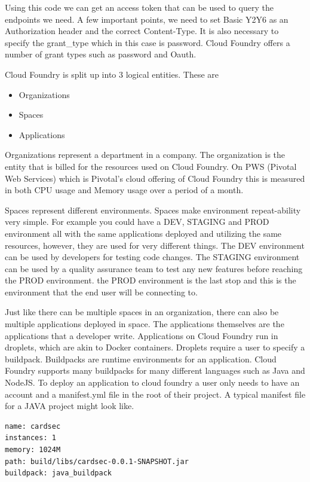 Using this code we can get an access token that can be used to query the endpoints we need. A few important points, we need to set Basic Y2Y6 as an Authorization header and the correct Content-Type. It is also necessary to specify the grant\_type which in this case is password. Cloud Foundry offers a number of grant types such as password and Oauth. 

Cloud Foundry is split up into 3 logical entities. These are

\begin{itemize}
  \item Organizations
  \item Spaces
  \item Applications
\end{itemize}

Organizations represent a department in a company. The organization is the entity that is billed for the resources used on Cloud Foundry. On PWS (Pivotal Web Services) which is Pivotal's cloud offering of Cloud Foundry this is measured in both CPU usage and Memory usage over a period of a month.

Spaces represent different environments. Spaces make environment repeat-ability very simple. For example you could have a DEV, STAGING and PROD environment all with the same applications deployed and utilizing the same resources, however, they are used for very different things. The DEV environment can be used by developers for testing code changes. The STAGING environment can be used by a quality assurance team to test any new features before reaching the PROD environment. the PROD environment is the last stop and this is the environment that the end user will be connecting to.

Just like there can be multiple spaces in an organization, there can also be multiple applications deployed in space. The applications themselves are the applications that a developer write. Applications on Cloud Foundry run in droplets, which are akin to Docker containers. Droplets require a user to specify a buildpack. Buildpacks are runtime environments for an application. Cloud Foundry supports many buildpacks for many different languages such as Java and NodeJS. To deploy an application to cloud foundry a user only needs to have an account and a manifest.yml file in the root of their project. A typical manifest file for a JAVA project might look like.

\begin{verbatim}
name: cardsec
instances: 1
memory: 1024M
path: build/libs/cardsec-0.0.1-SNAPSHOT.jar
buildpack: java_buildpack
\end{verbatim}


